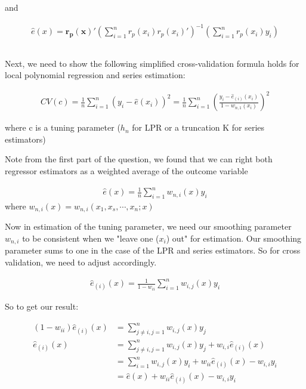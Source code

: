 \documentclass[12pt]{article}
\newcommand{\qsum}{\sum\limits_{i=1}^n}
\begin{document}
and

\begin{gather*}
\hat{e}(x) = \mathbf{r_p(x)'} \left(\sum\limits_{i=1}^n r_p(x_i)r_p(x_i)'\right)^{-1} \left( \sum\limits_{i=1}^n r_p(x_i)y_i\right)
\end{gather*}


\subsection{}

Next, we need to show the following simplified cross-validation formula holds for local polynomial regression and series estimation:

\begin{gather*}
CV(c) = \frac{1}{n} \sum\limits_{i=1}^n (y_i - \hat{e}(x_i))^2  =  \frac{1}{n} \sum\limits_{i=1}^n \left( \frac{y_i - \hat{e}_{(i)}(x_i)} {1-w_{n,1}(x_i)} \right)^2
\end{gather*}

where c is a tuning parameter ($h_n$ for LPR or a truncation K for series estimators)

Note from the first part of the question, we found that we can right both regressor estimators as a weighted average of the outcome variable

\begin{gather*}
\hat{e}(x) = \frac{1}{n} \qsum w_{n,i}(x)y_i
\end{gather*}
where $w_{n,i}(x) = w_{n,i}(x_1, x_s, \cdots, x_n;x)$

Now in estimation of the tuning parameter, we need our smoothing parameter $w_{n,i}$ to be consistent when we "leave one ($x_i$) out" for estimation. Our smoothing parameter sums to one in the case of the LPR and series estimators. So for cross validation, we need to adjust accordingly.


\begin{gather*}
\hat{e}_{(i)}(x) = \frac{1}{1-w_{ii}} \sum\limits_{i=1}^n w_{i,j}(x)y_i
\end{gather*}

So to get our result:

\begin{align*}
(1-w_{ii}) \hat{e}_{(i)}(x) & = \sum\limits_{j\neq i,j=1}^n w_{i,j}(x)y_j \\
\hat{e}_{(i)}(x) &= \sum\limits_{j\neq i,j=1}^n w_{i,j}(x)y_j + w_{i,i}\hat{e}_{(i)}(x) \\
  &= \sum\limits_{i=1}^n w_{i,j}(x)y_i + w_{ii}\hat{e}_{(i)}(x) - w_{i,i}y_i \\
&= \hat{e}(x) + w_{ii}\hat{e}_{(i)}(x) - w_{i,i}y_i \\
\end{align*}
\end{document}
